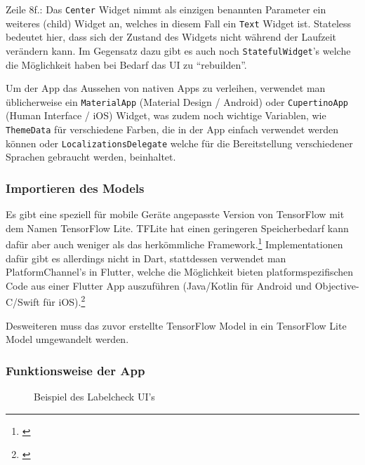 Zeile 8f.: Das \texttt{Center} Widget nimmt als einzigen benannten Parameter ein weiteres (child) Widget an, welches in diesem Fall ein \texttt{Text} Widget ist. Stateless bedeutet hier, dass sich der Zustand des Widgets nicht während der Laufzeit verändern kann. Im Gegensatz dazu gibt es auch noch \texttt{StatefulWidget}'s welche die Möglichkeit haben bei Bedarf das UI zu "`rebuilden"'.

Um der App das Aussehen von nativen Apps zu verleihen, verwendet man üblicherweise ein \texttt{MaterialApp} (Material Design / Android) oder \texttt{CupertinoApp} (Human Interface / iOS) Widget, was zudem noch wichtige Variablen, wie \texttt{ThemeData} für verschiedene Farben, die in der App einfach verwendet werden können oder \texttt{LocalizationsDelegate} welche für die Bereitstellung verschiedener Sprachen gebraucht werden, beinhaltet.

\subsubsection{Importieren des Models}

Es gibt eine speziell für mobile Geräte angepasste Version von TensorFlow mit dem Namen TensorFlow Lite. TFLite hat einen geringeren Speicherbedarf kann dafür aber auch weniger als das herkömmliche Framework.\footnote{\cite{tflite}} Implementationen dafür gibt es allerdings nicht in Dart, stattdessen verwendet man PlatformChannel's in Flutter, welche die Möglichkeit bieten platformspezifischen Code aus einer Flutter App auszuführen (Java/Kotlin für Android und Objective-C/Swift für iOS).\footnote{\cite{flutterplatformcode}}

Desweiteren muss das zuvor erstellte TensorFlow Model in ein TensorFlow Lite Model umgewandelt werden.

\subsubsection{Funktionsweise der App}

\setlength{\belowcaptionskip}{-10pt}
\begin{wrapfigure}{r}{55mm}
  \caption[]{Beispiel des Labelcheck UI's}
  \label{screenshot}
\end{wrapfigure}
\setlength{\belowcaptionskip}{0pt}

